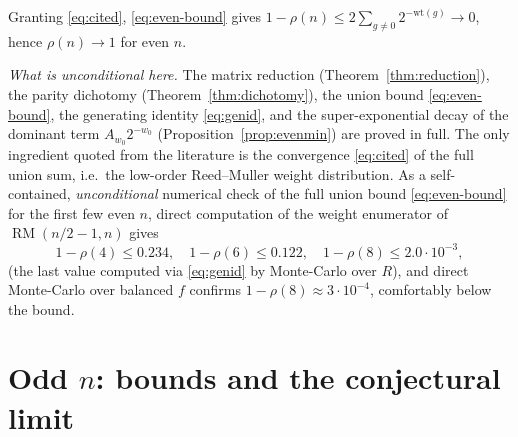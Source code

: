 \documentclass{amsart}
\theoremstyle{definition}
\DeclareMathOperator{\RM}{RM}
\begin{document}
Granting \eqref{eq:cited}, \eqref{eq:even-bound} gives
$1-\rho(n)\le 2\sum_{g\ne0}2^{-\mathrm{wt}(g)}\to0$, hence $\rho(n)\to1$
for even $n$.

\emph{What is unconditional here.} The matrix reduction
(Theorem~\ref{thm:reduction}), the parity dichotomy
(Theorem~\ref{thm:dichotomy}), the union bound \eqref{eq:even-bound}, the
generating identity \eqref{eq:genid}, and the super-exponential decay of the
dominant term $A_{w_0}2^{-w_0}$ (Proposition~\ref{prop:evenmin}) are proved
in full. The only ingredient quoted from the literature is the convergence
\eqref{eq:cited} of the full union sum, i.e.\ the low-order Reed--Muller
weight distribution. As a self-contained, \emph{unconditional} numerical
check of the full union bound \eqref{eq:even-bound} for the first few even
$n$, direct computation of the weight enumerator of $\RM(n/2-1,n)$ gives
\[
1-\rho(4)\le 0.234,\quad 1-\rho(6)\le 0.122,\quad 1-\rho(8)\le 2.0\cdot10^{-3},
\]
(the last value computed via \eqref{eq:genid} by Monte-Carlo over $R$), and
direct Monte-Carlo over balanced $f$ confirms
$1-\rho(8)\approx 3\cdot10^{-4}$, comfortably below the bound.

\section{Odd $n$: bounds and the conjectural limit}\label{sec:odd-asy}
\end{document}
